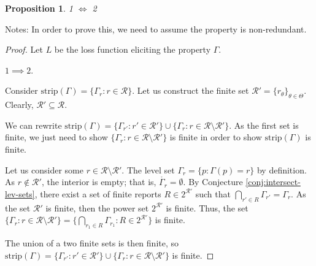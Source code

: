 \documentclass[12pt]{article}
\newcommand{\E}{\mathbb{E}}
\newcommand{\R}{\mathcal{R}}
\newcommand{\inter}[1]{\mathring{#1}}%
\newcommand{\strip}{\text{strip}}
\DeclareMathOperator*{\argmin}{arg\,min}
\newtheorem{proposition}{Proposition}
\begin{document}
\begin{proposition}\label{prop:optimal-reports-per-level-set}
1 $\iff$ 2
\end{proposition}



Notes:
In order to prove this, we need to assume the property is non-redundant.


\begin{proof}
Let $L$ be the loss function eliciting the property $\Gamma$.

$1 \implies 2$. 


Consider $\strip(\Gamma) = \{\Gamma_r : r \in \R \}$.
Let us construct the finite set $\R' = \{r_\theta \}_{\theta \in \Theta}$.
Clearly, $\R' \subseteq \R$.

We can rewrite $\strip(\Gamma) = \{\Gamma_{r'} : r' \in \R' \} \cup \{\Gamma_{r} : r \in \R \setminus \R' \}$.
As the first set is finite, we just need to show $\{\Gamma_{r} : r \in \R \setminus \R' \}$ is finite in order to show $\strip(\Gamma)$ is finite.

Let us consider some $r\in\R \setminus \R'$.
The level set $\Gamma_r = \{p : \Gamma(p) = r\}$ by definition.
As $r \not\in \R'$, the interior is empty; that is, $\inter{\Gamma_r} = \emptyset$.
By Conjecture \ref{conj:intersect-lev-sets}, there exist a set of finite reports $R \in 2^{\R'}$ such that $\bigcap_{r'\in R} \Gamma_{r'} = \Gamma_r$.
As the set $\R'$ is finite, then the power set $2^{\R'}$ is finite.
Thus, the set $\{ \Gamma_r : r \in \R \setminus \R' \} =  \{ \bigcap_{r_1 \in R} \Gamma_{r_1} : R \in 2^{\R'} \}$ is finite.


The union of a two finite sets is then finite, so $\strip(\Gamma) = \{ \Gamma_{r'} : r' \in \R' \} \cup \{ \Gamma_r : r \in \R \setminus \R' \}$ is finite.





\end{proof}
\end{document}
